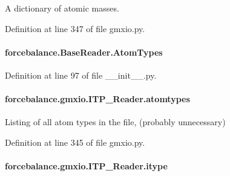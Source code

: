 A dictionary of atomic masses. 



Definition at line 347 of file gmxio.\-py.

\hypertarget{classforcebalance_1_1BaseReader_a69ca7d949a4a3df4d9f61e617fe0e270}{
\paragraph[{Atom\-Types}]{\setlength{\rightskip}{0pt plus 5cm}forcebalance.\-Base\-Reader.\-Atom\-Types\hspace{0.3cm}{\ttfamily [inherited]}}}\label{classforcebalance_1_1BaseReader_a69ca7d949a4a3df4d9f61e617fe0e270}


Definition at line 97 of file \-\_\-\-\_\-init\-\_\-\-\_\-.\-py.

\hypertarget{classforcebalance_1_1gmxio_1_1ITP__Reader_a771f60fa6b3020c422062bb9ceb51291}{
\paragraph[{atomtypes}]{\setlength{\rightskip}{0pt plus 5cm}forcebalance.\-gmxio.\-I\-T\-P\-\_\-\-Reader.\-atomtypes}}\label{classforcebalance_1_1gmxio_1_1ITP__Reader_a771f60fa6b3020c422062bb9ceb51291}


Listing of all atom types in the file, (probably unnecessary) 



Definition at line 345 of file gmxio.\-py.

\hypertarget{classforcebalance_1_1gmxio_1_1ITP__Reader_a1809bf22503b8647f48ea37c9f6f4cee}{
\paragraph[{itype}]{\setlength{\rightskip}{0pt plus 5cm}forcebalance.\-gmxio.\-I\-T\-P\-\_\-\-Reader.\-itype}}\label{classforcebalance_1_1gmxio_1_1ITP__Reader_a1809bf22503b8647f48ea37c9f6f4cee}


